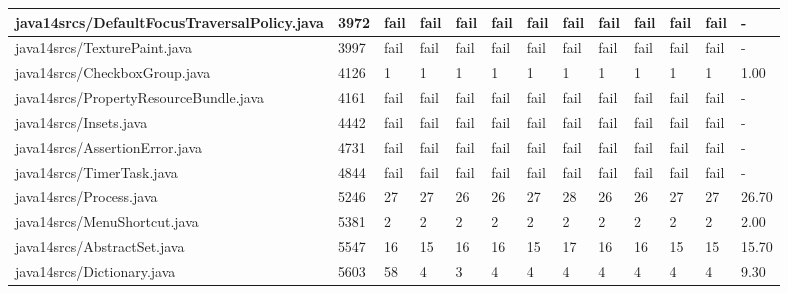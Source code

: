 \begin{tabular}{|l|l|l|l|l|l|l|l|l|l|l|l|l|}
\hline
java14srcs/DefaultFocusTraversalPolicy.java        & 3972        & fail      & fail      & fail      & fail      & fail      & fail      & fail      & fail      & fail      & fail      & -         \\
\hline
java14srcs/TexturePaint.java                       & 3997        & fail      & fail      & fail      & fail      & fail      & fail      & fail      & fail      & fail      & fail      & -         \\
\hline
java14srcs/CheckboxGroup.java                      & 4126        & 1         & 1         & 1         & 1         & 1         & 1         & 1         & 1         & 1         & 1         & 1.00      \\
\hline
java14srcs/PropertyResourceBundle.java             & 4161        & fail      & fail      & fail      & fail      & fail      & fail      & fail      & fail      & fail      & fail      & -         \\
\hline
java14srcs/Insets.java                             & 4442        & fail      & fail      & fail      & fail      & fail      & fail      & fail      & fail      & fail      & fail      & -         \\
\hline
java14srcs/AssertionError.java                     & 4731        & fail      & fail      & fail      & fail      & fail      & fail      & fail      & fail      & fail      & fail      & -         \\
\hline
java14srcs/TimerTask.java                          & 4844        & fail      & fail      & fail      & fail      & fail      & fail      & fail      & fail      & fail      & fail      & -         \\
\hline
java14srcs/Process.java                            & 5246        & 27        & 27        & 26        & 26        & 27        & 28        & 26        & 26        & 27        & 27        & 26.70     \\
\hline
java14srcs/MenuShortcut.java                       & 5381        & 2         & 2         & 2         & 2         & 2         & 2         & 2         & 2         & 2         & 2         & 2.00      \\
\hline
java14srcs/AbstractSet.java                        & 5547        & 16        & 15        & 16        & 16        & 15        & 17        & 16        & 16        & 15        & 15        & 15.70     \\
\hline
java14srcs/Dictionary.java                         & 5603        & 58        & 4         & 3         & 4         & 4         & 4         & 4         & 4         & 4         & 4         & 9.30      \\

\end{tabular}
